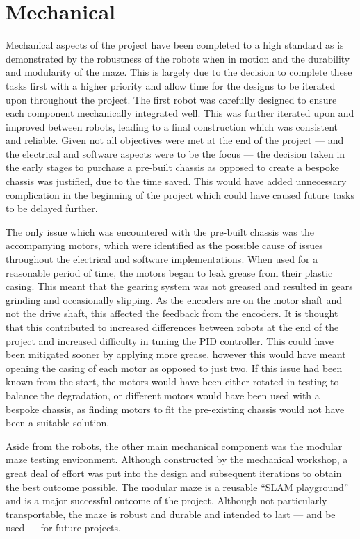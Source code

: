 \section{Mechanical}\label{eval/mech} 
Mechanical aspects of the project have been completed to a 
high standard as is demonstrated by the robustness of the robots when in 
motion and the durability and modularity of the maze. This is largely due to the 
decision to complete these tasks first with a higher priority and allow time for the 
designs to be iterated upon throughout the project. The first robot was carefully 
designed to ensure each component mechanically integrated well. This was further 
iterated upon and improved between robots, leading to a final construction which was 
consistent and reliable. Given not all objectives were met at the end of the project 
--- and the electrical and software aspects were to be the focus --- the decision taken in the 
early stages to purchase a pre-built chassis as opposed to create a bespoke chassis 
was justified, due to the time saved. This would have added unnecessary complication 
in the beginning of the project which could have caused future 
tasks to be delayed further. 

The only issue which was encountered with the pre-built chassis was the 
accompanying motors, which were identified as the possible cause of 
issues throughout the electrical and software implementations. When used 
for a reasonable period of time, the motors began to leak grease from 
their plastic casing. This meant that the gearing system was not greased 
and resulted in gears grinding and occasionally slipping. As the 
encoders are on the motor shaft and not the drive shaft, this affected 
the feedback from the encoders. It is thought that this contributed to 
increased differences between robots at the end of the project and 
increased difficulty in tuning the PID controller. This could have been 
mitigated sooner by applying more grease, however this would have meant 
opening the casing of each motor as opposed to just two. If this issue 
had been known from the start, the motors would have been either rotated 
in testing to balance the degradation, or different motors would have 
been used with a bespoke chassis, as finding motors to fit the pre-existing 
chassis would not have been a suitable solution. 

Aside from the robots, the other main mechanical component was the modular maze 
testing environment. Although constructed by the mechanical workshop, a great deal of 
effort was put into the design and subsequent iterations to obtain the best outcome 
possible. The modular maze is a reusable ``SLAM playground'' and is a major 
successful outcome of the project. Although not particularly transportable, the maze 
is robust and durable and intended to last --- and be used --- for future projects.

